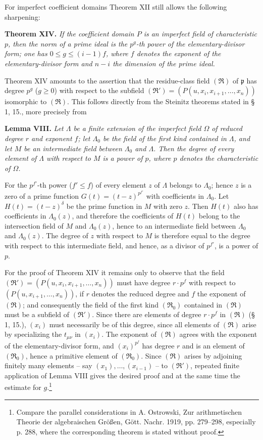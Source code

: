 \documentclass[11pt]{article}
\providecommand{\mR}{\mathfrak{R}}
\providecommand{\frakp}{\mathfrak p}
\providecommand{\mR}{\mathfrak{R}}
\providecommand{\frakp}{\mathfrak p}
\providecommand{\frakp}{\mathfrak p}
\begin{document}
For imperfect coefficient domains Theorem XII still allows the following sharpening:

\textbf{Theorem XIV.} \emph{If the coefficient domain $P$ is an imperfect field of characteristic $p$, then the norm of a prime ideal is the $p^g$-th power of the elementary-divisor form; one has $0\le g\le(i-1)f$, where $f$ denotes the exponent of the elementary-divisor form and $n-i$ the dimension of the prime ideal.}

Theorem XIV amounts to the assertion that the residue-class field $(\mR)$ of $\frakp$ has degree $p^g$ ($g\ge0$) with respect to the subfield $(\mR')=(P(u,x_i,x_{i+1},\ldots,x_n))$ isomorphic to $(\mR)$. This follows directly from the Steinitz theorems stated in § 1, 15., more precisely from

\textbf{Lemma VIII.} \emph{Let $\Lambda$ be a finite extension of the imperfect field $\Omega$ of reduced degree $r$ and exponent $f$; let $\Lambda_0$ be the field of the first kind contained in $\Lambda$, and let $M$ be an intermediate field between $\Lambda_0$ and $\Lambda$. Then the degree of every element of $\Lambda$ with respect to $M$ is a power of $p$, where $p$ denotes the characteristic of $\Omega$.}

For the $p^{f'}$-th power ($f'\le f$) of every element $z$ of $\Lambda$ belongs to $\Lambda_0$; hence $z$ is a zero of a prime function $G(t)=(t-z)^{p^{f'}}$ with coefficients in $\Lambda_0$. Let $H(t)=(t-z)^\delta$ be the prime function in $M$ with zero $z$. Then $H(t)$ also has coefficients in $\Lambda_0(z)$, and therefore the coefficients of $H(t)$ belong to the intersection field of $M$ and $\Lambda_0(z)$, hence to an intermediate field between $\Lambda_0$ and $\Lambda_0(z)$. The degree of $z$ with respect to $M$ is therefore equal to the degree with respect to this intermediate field, and hence, as a divisor of $p^{f'}$, is a power of $p$.

For the proof of Theorem XIV it remains only to observe that the field $(\mR')=(P(u,x_i,x_{i+1},\ldots,x_n))$ must have degree $r\cdot p^f$ with respect to $(P(u,x_{i+1},\ldots,x_n))$, if $r$ denotes the reduced degree and $f$ the exponent of $(\mR)$; and consequently the field of the first kind $(\mR_0)$ contained in $(\mR)$ must be a subfield of $(\mR')$. Since there are elements of degree $r\cdot p^f$ in $(\mR)$ (§ 1, 15.), $(x_i)$ must necessarily be of this degree, since all elements of $(\mR)$ arise by specializing the $t_{\mu\nu}$ in $(x_i)$. The exponent of $(\mR)$ agrees with the exponent of the elementary-divisor form, and $(x_i)^{p^f}$ has degree $r$ and is an element of $(\mR_0)$, hence a primitive element of $(\mR_0)$. Since $(\mR)$ arises by adjoining finitely many elements -- say $(x_1),\ldots,(x_{i-1})$ -- to $(\mR')$, repeated finite application of Lemma VIII gives the desired proof and at the same time the estimate for $g$.\footnote{Compare the parallel considerations in A. Ostrowski, Zur arithmetischen Theorie der algebraischen Größen, Gött. Nachr. 1919, pp. 279--298, especially p. 288, where the corresponding theorem is stated without proof.}
\end{document}
